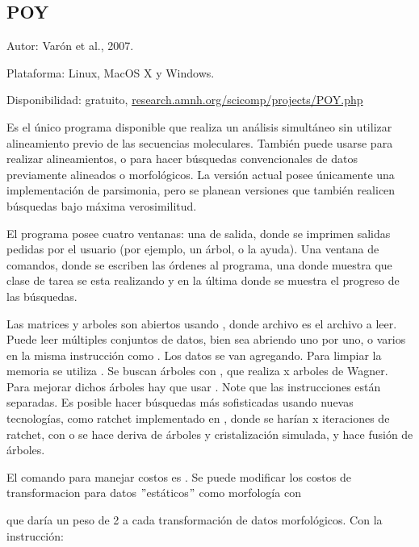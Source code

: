 \subsection{POY}
\noindent
Autor: Var\'on et al., 2007.

Plataforma: Linux, MacOS X y Windows.

Disponibilidad: gratuito, \url{research.amnh.org/scicomp/projects/POY.php}


Es el \'unico programa disponible que realiza un an\'alisis simult\'aneo sin utilizar alineamiento previo de las secuencias moleculares. Tambi\'en puede usarse para realizar alineamientos, o para hacer b\'usquedas convencionales de datos previamente alineados o morfol\'ogicos. La versi\'on actual posee \'unicamente una implementaci\'on de parsimonia, pero se planean versiones que tambi\'en realicen b\'usquedas bajo m\'axima verosimilitud.

El programa posee cuatro ventanas: una de salida, donde se imprimen salidas pedidas por el usuario (por ejemplo, un \'arbol, o la ayuda). Una ventana de comandos, donde se escriben las \'ordenes al programa, una donde muestra que clase de tarea se esta realizando y en la \'ultima donde se muestra el progreso de las b\'usquedas.

Las matrices y arboles son abiertos usando , donde archivo es el archivo a leer. Puede leer m\'ultiples conjuntos de datos, bien sea abriendo uno por uno, o varios en la misma instrucci\'on como . Los datos se van agregando. Para limpiar la memoria se utiliza . Se buscan \'arboles con , que realiza x arboles de Wagner. Para mejorar dichos \'arboles hay que usar . Note que las instrucciones est\'an separadas. Es posible hacer b\'usquedas m\'as sofisticadas usando nuevas tecnolog\'ias, como ratchet implementado en , donde se har\'ian x iteraciones de ratchet, con  o  se hace deriva de \'arboles y cristalizaci\'on simulada, y  hace fusi\'on de \'arboles.

El comando para manejar costos es . Se puede modificar los costos de transformacion para datos $"$est\'aticos$"$ como morfolog\'ia con 

que dar\'ia un peso de 2 a cada transformaci\'on de datos morfol\'ogicos. Con la instrucci\'on:


